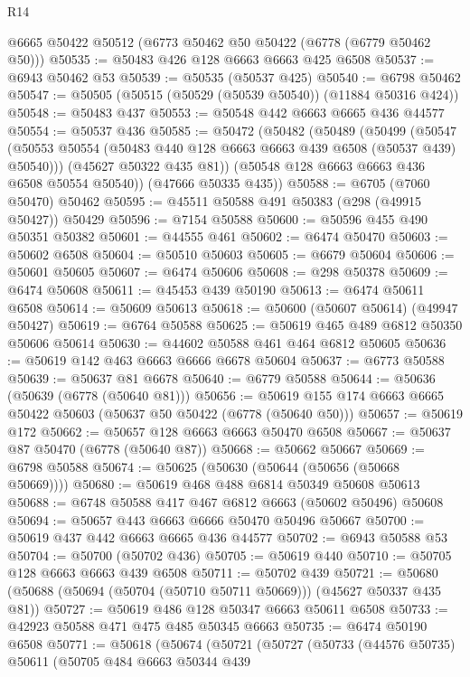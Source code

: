 \begin{lexlean}{R14}
\begin{coremodule}
    @6665
    @50422
    @50512
    (@6773 @50462 @50 @50422 (@6778 (@6779 @50462 @50)))
@50535 := @50483 @426 @128 @6663 @6663 @425 @6508
@50537 := @6943 @50462 @53
@50539 := @50535 (@50537 @425)
@50540 := @6798 @50462
@50547 := @50505 (@50515 (@50529 (@50539 @50540)) (@11884 @50316 @424))
@50548 := @50483 @437
@50553 := @50548 @442 @6663 @6665 @436 @44577
@50554 := @50537 @436
@50585 := @50472
    (@50482
      (@50489
        (@50499
          (@50547 (@50553 @50554 (@50483 @440 @128 @6663 @6663 @439 @6508 (@50537 @439) @50540)))
          (@45627 @50322 @435 @81))
        (@50548 @128 @6663 @6663 @436 @6508 @50554 @50540))
      (@47666 @50335 @435))
@50588 := @6705 (@7060 @50470) @50462
@50595 := @45511 @50588 @491 @50383 (@298 (@49915 @50427)) @50429
@50596 := @7154 @50588
@50600 := @50596 @455 @490 @50351 @50382
@50601 := @44555 @461
@50602 := @6474 @50470
@50603 := @50602 @6508
@50604 := @50510 @50603
@50605 := @6679 @50604
@50606 := @50601 @50605
@50607 := @6474 @50606
@50608 := @298 @50378
@50609 := @6474 @50608
@50611 := @45453 @439 @50190
@50613 := @6474 @50611 @6508
@50614 := @50609 @50613
@50618 := @50600 (@50607 @50614) (@49947 @50427)
@50619 := @6764 @50588
@50625 := @50619 @465 @489 @6812 @50350 @50606 @50614
@50630 := @44602 @50588 @461 @464 @6812 @50605
@50636 := @50619 @142 @463 @6663 @6666 @6678 @50604
@50637 := @6773 @50588
@50639 := @50637 @81 @6678
@50640 := @6779 @50588
@50644 := @50636 (@50639 (@6778 (@50640 @81)))
@50656 := @50619 @155 @174 @6663 @6665 @50422 @50603 (@50637 @50 @50422 (@6778 (@50640 @50)))
@50657 := @50619 @172
@50662 := @50657 @128 @6663 @6663 @50470 @6508
@50667 := @50637 @87 @50470 (@6778 (@50640 @87))
@50668 := @50662 @50667
@50669 := @6798 @50588
@50674 := @50625 (@50630 (@50644 (@50656 (@50668 @50669))))
@50680 := @50619 @468 @488 @6814 @50349 @50608 @50613
@50688 := @6748 @50588 @417 @467 @6812 @6663 (@50602 @50496) @50608
@50694 := @50657 @443 @6663 @6666 @50470 @50496 @50667
@50700 := @50619 @437 @442 @6663 @6665 @436 @44577
@50702 := @6943 @50588 @53
@50704 := @50700 (@50702 @436)
@50705 := @50619 @440
@50710 := @50705 @128 @6663 @6663 @439 @6508
@50711 := @50702 @439
@50721 := @50680 (@50688 (@50694 (@50704 (@50710 @50711 @50669))) (@45627 @50337 @435 @81))
@50727 := @50619 @486 @128 @50347 @6663 @50611 @6508
@50733 := @42923 @50588 @471 @475 @485 @50345 @6663
@50735 := @6474 @50190 @6508
@50771 := @50618
    (@50674
      (@50721
        (@50727
          (@50733
            (@44576 @50735)
            @50611
            (@50705
              @484
              @6663
              @50344
              @439

\end{coremodule}
\end{lexlean}
